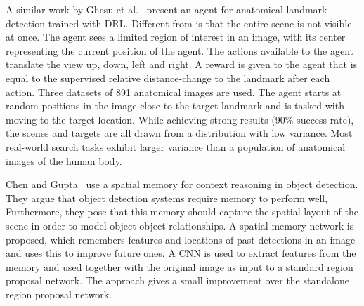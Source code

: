A similar work by Ghesu et al.~\cite{ghesu_artificial_2016} present an agent for anatomical landmark detection trained with DRL.
Different from \cite{caicedo_active_2015} is that the entire scene is not visible at once.
The agent sees a limited region of interest in an image, with its center representing the current position of the agent.
The actions available to the agent translate the view up, down, left and right.
A reward is given to the agent that is equal to the supervised relative distance-change to the landmark after each action.
Three datasets of 891 anatomical images are used.
The agent starts at random positions in the image close to the target landmark and is tasked with moving to the target location.
While achieving strong results (90\% success rate), the scenes and targets are all drawn from a distribution with low variance.
Most real-world search tasks exhibit larger variance than a population of anatomical images of the human body.

Chen and Gupta~\cite{chen_memory_2017} use a spatial memory for context reasoning in object detection.
They argue that object detection systems require memory to perform well,
Furthermore, they pose that this memory should capture the spatial layout of the scene in order to model object-object relationships.
A spatial memory network is proposed, which remembers features and locations of past detections in an image and uses this to improve future ones.
A CNN is used to extract features from the memory and used together with the original image as input to a standard region proposal network.
The approach gives a small improvement over the standalone region proposal network.



